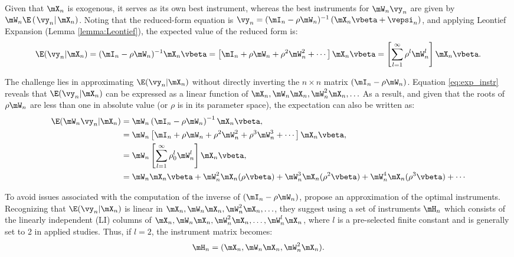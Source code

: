 Given that $\mX_n$ is exogenous, it serves as its own best instrument, whereas the best instruments for $\mW_n\vy_n$ are given by $\mW_n\E\left(\left.\vy_n\right|\mX_n\right)$. Noting that the reduced-form equation is $\vy_n = (\mI_n - \rho\mW_n)^{-1}\left(\mX_n\vbeta + \vepsi_n \right)$, and applying Leontief Expansion (Lemma \ref{lemma:Leontief}), the expected value of the reduced form is:
\begin{equation}\label{eq:exp_instr}
  \E(\vy_n|\mX_n) = (\mI_n - \rho\mW_n)^{-1}\mX_n\vbeta = \left[\mI_n + \rho\mW_n + \rho^2\mW_n^2 + \cdots \right]\mX_n\vbeta = \left[\sum_{l = 1}^{\infty}\rho^{l}\mW^l_n\right]\mX_n\vbeta.
\end{equation}

The challenge lies in approximating  $\E(\vy_n|\mX_n)$ without directly inverting the $n\times n$ matrix $(\mI_n - \rho\mW_n)$. Equation \eqref{eq:exp_instr} reveals that $\E(\vy_n|\mX_n)$ can be expressed as a linear function of $\mX_n, \mW_n\mX_n, \mW^2_n\mX_n, \ldots$ As a result, and given that the roots of $\rho\mW_n$ are less than one in absolute value (or $\rho$ is in its parameter space), the expectation can also be written as:
\begin{equation*}
  \begin{aligned}
\E(\mW_n\vy_n|\mX_n) &  = \mW_n\left(\mI_n - \rho \mW_n\right)^{-1}\mX_n\vbeta, \\
               & = \mW_n\left[\mI_n + \rho\mW_n + \rho^2\mW^2_n + \rho^3\mW^3_n + \cdots\right]\mX_n\vbeta, \\
               & = \mW_n\left[\sum_{l = 1}^{\infty}\rho_0^{l}\mW^l_n\right]\mX_n\vbeta, \\
               & = \mW_n\mX_n\vbeta + \mW^2_n\mX_n(\rho\vbeta) + \mW^3_n\mX_n(\rho^2\vbeta) + \mW^4_n\mX_n(\rho^3\vbeta) + \cdots
  \end{aligned}
\end{equation*}

To avoid issues associated with the computation of the inverse of $(\mI_n - \rho\mW_n)$,  \cite{kelejian1998generalized, kelejian1999generalized} propose an approximation of the optimal instruments. Recognizing that $\E(\vy_n|\mX_n)$ is linear in $\mX_n, \mW_n\mX_n, \mW^2_n\mX_n, \ldots$, they suggest using a set of instruments $\mH_n$ which consists of the linearly independent (LI) columns of  $\mX_n, \mW_n\mX_n, \mW^2_n\mX_n, \ldots, \mW^l_n\mX_n$,  where $l$ is a pre-selected finite constant and is generally set to 2 in applied studies. Thus, if $l =2$, the instrument matrix becomes:
\begin{equation*}
  \mH_n = (\mX_n, \mW_n\mX_n, \mW^2_n\mX_n).
\end{equation*}


